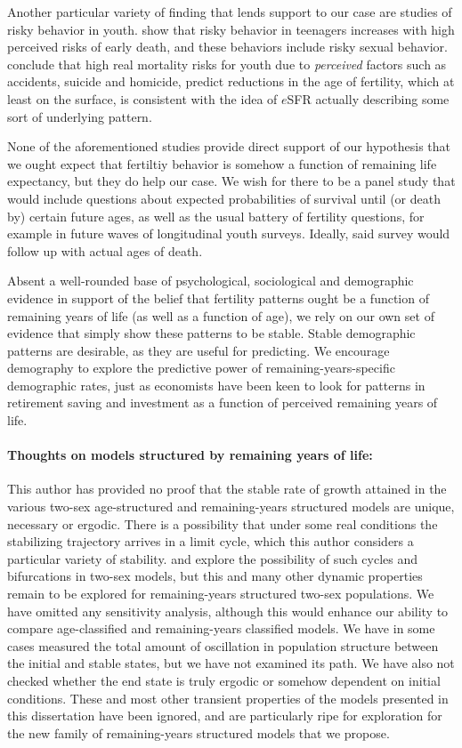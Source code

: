 Another particular variety of finding that lends support to our case are studies
of risky behavior in youth. \citet{borowsky2009health} show that risky behavior
in teenagers increases with high perceived risks of early death, and these
behaviors include risky sexual behavior. \citet{wilson1997life} conclude that
high real mortality risks for youth due to \textit{perceived} factors such as 
accidents, suicide and homicide, predict reductions in the age of fertility, which at
least on the surface, is consistent with the idea of $e$SFR actually describing 
some sort of underlying pattern. 

None of the aforementioned studies provide
direct support of our hypothesis that we ought expect that fertiltiy behavior is
somehow a function of remaining life expectancy, but they do help our case. We
wish for there to be a panel study that would include questions about expected probabilities of
survival until (or death by) certain future ages, as well as the usual battery
of fertility questions, for example in future waves of longitudinal youth surveys.
Ideally, said survey would follow up with actual ages of death. 

Absent a well-rounded base of psychological, sociological and demographic
evidence in support of the belief that fertility patterns ought be a function of
remaining years of life (as well as a function of age), we rely on our own
set of evidence that simply show these patterns to be stable. Stable demographic
patterns are desirable, as they are useful for predicting. We encourage
demography to explore the predictive power of remaining-years-specific
demographic rates, just as economists have been keen to look for patterns in
retirement saving and investment as a function of perceived remaining years of
life.

\paragraph{Thoughts on models structured by remaining years of life: }
This author has provided no proof that the stable rate of growth
attained in the various two-sex age-structured and remaining-years structured
models are unique, necessary or ergodic. There is a possibility that under some
real conditions the stabilizing trajectory arrives in a limit cycle, which this
author considers a particular variety of stability. \citet{wijewickrema1980weak}
and \citet{chung1990phd, chung1994cycles} explore the possibility of such cycles
and bifurcations in two-sex models, but this and many other dynamic
properties remain to be explored for remaining-years structured two-sex
populations. We have omitted any sensitivity analysis, although this would
enhance our ability to compare age-classified and remaining-years
classified models. We have in some cases measured the total amount of
oscillation in population structure between the initial and stable states, but
we have not examined its path. We have also not checked whether the end state
is truly ergodic or somehow dependent on initial conditions. These and most
other transient properties of the models presented in this dissertation have
been ignored, and are particularly ripe for exploration for the new family of
remaining-years structured models that we propose.

